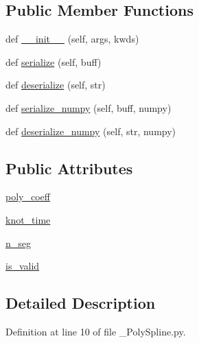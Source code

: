 \subsection*{Public Member Functions}
\begin{DoxyCompactItemize}
\item 
def \hyperlink{classtraj__gen_1_1msg_1_1___poly_spline_1_1_poly_spline_a945dc2ad36ee11570e9d0e01da793215}{\+\_\+\+\_\+init\+\_\+\+\_\+} (self, args, kwds)
\item 
def \hyperlink{classtraj__gen_1_1msg_1_1___poly_spline_1_1_poly_spline_a578b8ed402c949ae4cb8c27e239ba020}{serialize} (self, buff)
\item 
def \hyperlink{classtraj__gen_1_1msg_1_1___poly_spline_1_1_poly_spline_a4400101faca7708f45ea3b75b1d66eca}{deserialize} (self, str)
\item 
def \hyperlink{classtraj__gen_1_1msg_1_1___poly_spline_1_1_poly_spline_ab74dc65de629f9c146f195731da9d0dd}{serialize\+\_\+numpy} (self, buff, numpy)
\item 
def \hyperlink{classtraj__gen_1_1msg_1_1___poly_spline_1_1_poly_spline_a632e2dbb3f7a55de016b87b5c7bbd195}{deserialize\+\_\+numpy} (self, str, numpy)
\end{DoxyCompactItemize}
\subsection*{Public Attributes}
\begin{DoxyCompactItemize}
\item 
\hyperlink{classtraj__gen_1_1msg_1_1___poly_spline_1_1_poly_spline_ab1959a0acb17ab5f700218083585eb4a}{poly\+\_\+coeff}
\item 
\hyperlink{classtraj__gen_1_1msg_1_1___poly_spline_1_1_poly_spline_a23360d726d4ce68320326189ae329979}{knot\+\_\+time}
\item 
\hyperlink{classtraj__gen_1_1msg_1_1___poly_spline_1_1_poly_spline_ab02eaeb5ab7d686f08611f296f3c6e4b}{n\+\_\+seg}
\item 
\hyperlink{classtraj__gen_1_1msg_1_1___poly_spline_1_1_poly_spline_aa319b62e5a8c569ca855ec359341e4ed}{is\+\_\+valid}
\end{DoxyCompactItemize}


\subsection{Detailed Description}


Definition at line 10 of file \+\_\+\+Poly\+Spline.\+py.



